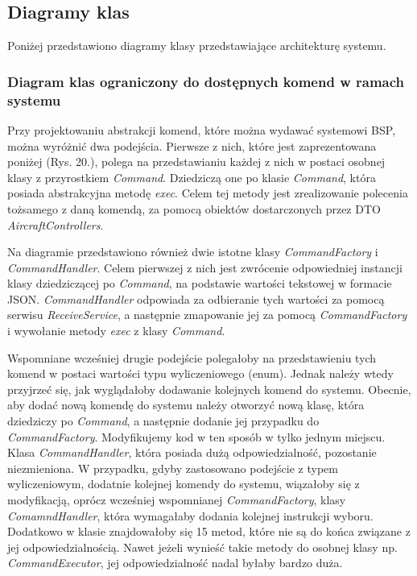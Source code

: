 \newpage
\subsection{Diagramy klas}
Poniżej przedstawiono diagramy klasy przedstawiające architekturę systemu.

\subsubsection{Diagram klas ograniczony do dostępnych komend w ramach systemu}

Przy projektowaniu abstrakcji komend, które można wydawać systemowi BSP, można wyróżnić dwa podejścia. Pierwsze z nich, które jest zaprezentowana poniżej (Rys. 20.), polega na przedstawianiu każdej z nich w postaci osobnej klasy z przyrostkiem \textit{Command}. Dziedziczą one po klasie \textit{Command}, która posiada abstrakcyjna metodę \textit{exec}. Celem tej metody jest zrealizowanie polecenia tożsamego z daną komendą, za pomocą obiektów dostarczonych przez DTO \textit{AircraftControllers}.

Na diagramie przedstawiono również dwie istotne klasy \textit{CommandFactory} i \textit{CommandHandler}. Celem pierwszej z nich jest zwrócenie odpowiedniej instancji klasy dziedziczącej po \textit{Command}, na podstawie wartości tekstowej w formacie JSON. \textit{CommandHandler} odpowiada za odbieranie tych wartości za pomocą serwisu \textit{ReceiveService}, a następnie zmapowanie jej za pomocą \textit{CommandFactory} i wywołanie metody \textit{exec} z klasy \textit{Command}.

Wspomniane wcześniej drugie podejście polegałoby na przedstawieniu tych komend w postaci wartości typu wyliczeniowego (enum). Jednak należy wtedy przyjrzeć się, jak wyglądałoby dodawanie kolejnych komend do systemu. Obecnie, aby dodać nową komendę do systemu należy otworzyć nową klasę, która dziedziczy po \textit{Command}, a następnie dodanie jej przypadku do \textit{CommandFactory}. Modyfikujemy kod w ten sposób w tylko jednym miejscu. Klasa \textit{CommandHandler}, która posiada dużą odpowiedzialność, pozostanie niezmieniona. W przypadku, gdyby zastosowano podejście z typem wyliczeniowym, dodatnie kolejnej komendy do systemu, wiązałoby się z modyfikacją, oprócz wcześniej wspomnianej \textit{CommandFactory}, klasy \textit{ComamndHandler}, która wymagałaby dodania kolejnej instrukcji wyboru. Dodatkowo w klasie znajdowałoby się 15 metod, które nie są do końca związane z jej odpowiedzialnością. Nawet jeżeli wynieść takie metody do osobnej klasy np. \textit{CommandExecutor}, jej odpowiedzialność nadal byłaby bardzo duża.

